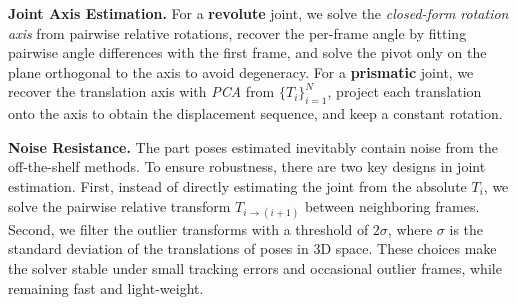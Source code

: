 \noindent \textbf{Joint Axis Estimation.} For a \textbf{revolute} joint, we solve the \textit{closed-form rotation axis} from pairwise relative rotations, recover the per-frame angle by fitting pairwise angle differences with the first frame, and solve the pivot only on the plane orthogonal to the axis to avoid degeneracy. For a \textbf{prismatic} joint, we recover the translation axis with \textit{PCA} from $\{{T}_i\}_{i=1}^N$, project each translation onto the axis to obtain the displacement sequence, and keep a constant rotation. 

\noindent \textbf{Noise Resistance.} The part poses estimated inevitably contain noise from the off-the-shelf methods. To ensure robustness, there are two key designs in joint estimation. First, instead of directly estimating the joint from the absolute ${T}_i$, we solve the pairwise relative transform ${T}_{i \to (i+1)}$ between neighboring frames. Second, we filter the outlier transforms with a threshold of $2\sigma$, where $\sigma$ is the standard deviation of the translations of poses in 3D space. These choices make the solver stable under small tracking errors and occasional outlier frames, while remaining fast and light-weight.


